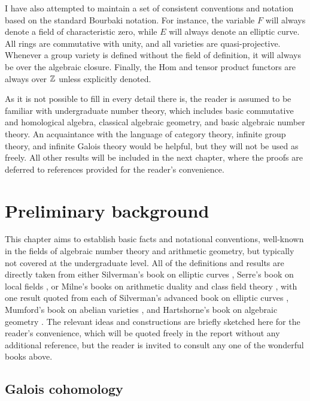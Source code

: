 I have also attempted to maintain a set of consistent conventions and notation based on the standard Bourbaki notation. For instance, the variable $ F $ will always denote a field of characteristic zero, while $ E $ will always denote an elliptic curve. All rings are commutative with unity, and all varieties are quasi-projective. Whenever a group variety is defined without the field of definition, it will always be over the algebraic closure. Finally, the Hom and tensor product functors are always over $ \mathbb{Z} $ unless explicitly denoted.

As it is not possible to fill in every detail there is, the reader is assumed to be familiar with undergraduate number theory, which includes basic commutative and homological algebra, classical algebraic geometry, and basic algebraic number theory. An acquaintance with the language of category theory, infinite group theory, and infinite Galois theory would be helpful, but they will not be used as freely. All other results will be included in the next chapter, where the proofs are deferred to references provided for the reader's convenience.

\pagebreak

\chapter{Preliminary background}

This chapter aims to establish basic facts and notational conventions, well-known in the fields of algebraic number theory and arithmetic geometry, but typically not covered at the undergraduate level. All of the definitions and results are directly taken from either Silverman's book on elliptic curves \cite{Sil09}, Serre's book on local fields \cite{Ser80}, or Milne's books on arithmetic duality \cite{Mil06} and class field theory \cite{Mil13}, with one result quoted from each of Silverman's advanced book on elliptic curves \cite{Sil94}, Mumford's book on abelian varieties \cite{Mum70}, and Hartshorne's book on algebraic geometry \cite{Har77}. The relevant ideas and constructions are briefly sketched here for the reader's convenience, which will be quoted freely in the report without any additional reference, but the reader is invited to consult any one of the wonderful books above.

\section{Galois cohomology}

